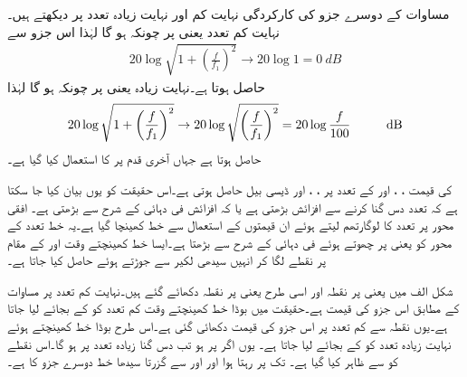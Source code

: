مساوات کے دوسرے جزو کی کارکردگی نہایت کم اور نہایت زیادہ تعدد پر دیکھتے ہیں۔نہایت کم تعدد یعنی  پر چونکہ  ہو گا لہٰذا اس جزو سے
\begin{align} \label{مساوات_تعدد_ردعمل_بوڈا_کم_تعدد_حصہ}
20 \log  \sqrt{1+\left(\frac{f}{f_1}\right)^2}  \to 20 \log 1 =\SI{0}{dB}
\end{align}
حاصل ہوتا ہے۔نہایت زیادہ یعنی  پر چونکہ  ہو گا لہٰذا
\begin{align} \label{مساوات_تعدد_ردعمل_بوڈا_زیادہ_تعدد_حصہ}
20 \log  \sqrt{1+\left(\frac{f}{f_1}\right)^2} \to 20 \log \sqrt{\left(\frac{f}{f_1}\right)^2} =20 \log \frac{f}{100} \hspace{1 cm} \SI{}{dB}
\end{align}
حاصل ہوتا ہے جہاں آخری قدم پر  کا استعمال کیا گیا ہے۔

 کی قیمت ، ،  اور  کے تعدد پر ، ،  اور  ڈیسی بیل حاصل ہوتی ہے۔اس حقیقت کو یوں بیان کیا جا سکتا ہے کہ تعدد دس گنا کرنے سے افزائش  بڑھتی ہے یا کہ افزائش   فی دہائی کے شرح سے بڑھتی ہے۔ افقی محور پر تعدد کا لوگارتھم لیتے ہوئے ان قیمتوں کے استعمال سے خط کھینچا گیا ہے۔یہ خط تعدد کے محور کو  یعنی  پر چھوتے ہوئے  فی دہائی کے شرح سے بڑھتا ہے۔ایسا خط کھینچتے وقت   اور   کے مقام پر نقطے  لگا کر انہیں سیدھی لکیر سے جوڑتے ہوئے حاصل کیا جاتا ہے۔

شکل  الف میں  یعنی  پر نقطہ  اور اسی طرح  یعنی  پر نقطہ  دکھائے گئے ہیں۔نہایت کم تعدد پر مساوات  کے مطابق اس جزو کی قیمت  ہے۔حقیقت میں بوڈا خط کھینچتے وقت کم تعدد کو  کے بجائے  لیا جاتا ہے۔یوں نقطہ  سے کم تعدد پر اس جزو کی قیمت  دکھائی گئی ہے۔اس طرح بوڈا خط کھینچتے ہوئے  نہایت زیادہ تعدد کو  کے بجائے  لیا جاتا ہے۔ یوں اگر  پر  ہو تب دس گنا زیادہ تعدد پر  ہو گا۔اس نقطے  کو  سے ظاہر کیا گیا ہے۔ تک  پر رہتا ہوا اور  اور  سے گزرتا سیدھا خط دوسرے جزو کا  ہے۔



